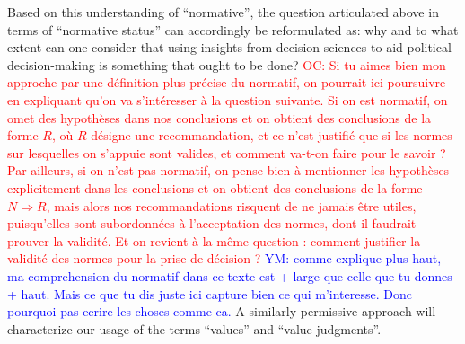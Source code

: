 \documentclass[preprint, french, english, 11pt]{elsarticle}%
\newcommand{\commentYM}[1]{\textcolor{blue}{YM: #1}}
\newcommand{\commentOC}[1]{\textcolor{red}{OC: #1}}
\begin{document}
Based on this understanding of ``normative'', the question articulated above in terms of ``normative status'' can accordingly be reformulated as: why and to what extent can one consider that using insights from decision sciences to aid political decision-making is something that ought to be done?
\commentOC{Si tu aimes bien mon approche par une définition plus précise du normatif, on pourrait ici poursuivre en expliquant qu’on va s’intéresser à la question suivante. Si on est normatif, on omet des hypothèses dans nos conclusions et on obtient des conclusions de la forme $R$, où $R$ désigne une recommandation, et ce n’est justifié que si les normes sur lesquelles on s’appuie sont valides, et comment va-t-on faire pour le savoir ? Par ailleurs, si on n’est pas normatif, on pense bien à mentionner les hypothèses explicitement dans les conclusions et on obtient des conclusions de la forme $N ⇒ R$, mais alors nos recommandations risquent de ne jamais être utiles, puisqu’elles sont subordonnées à l’acceptation des normes, dont il faudrait prouver la validité. Et on revient à la même question : comment justifier la validité des normes pour la prise de décision ?}
\commentYM{comme explique plus haut, ma comprehension du normatif dans ce texte est + large que celle que tu donnes + haut. Mais ce que tu dis juste ici capture bien ce qui m'interesse. Donc pourquoi pas ecrire les choses comme ca. }
 A similarly permissive approach will characterize our usage of the terms ``values'' and ``value-judgments''.
\end{document}
